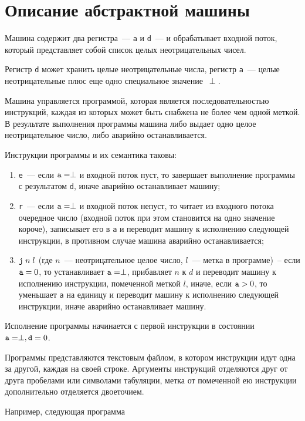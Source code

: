 \documentclass{article}
\newcommand{\cd}[1]{\texttt{#1}}
\begin{document}
\section*{Описание абстрактной машины}

Машина содержит два регистра~--- \cd{a} и \cd{d}~--- и обрабатывает входной поток, который
представляет собой список целых неотрицательных чисел. 

Регистр \cd{d} может хранить целые неотрицательные числа, регистр \cd{a}~--- целые неотрицательные
плюс еще одно специальное значение~$\perp$.

Машина управляется программой, которая является последовательностью инструкций, каждая из
которых может быть снабжена не более чем одной меткой. В результате выполнения программы
машина либо выдает одно целое неотрицательное число, либо аварийно останавливается.
 
Инструкции программы и их семантика таковы:

\begin{enumerate}
\item \cd{e}~--- если $\mbox{\cd{a}}=\perp$ и входной поток пуст, то завершает выполнение
программы с результатом \cd{d}, иначе аварийно останавливает машину;
\item \cd{r}~--- если  $\mbox{\cd{a}}=\perp$ и входной поток непуст, то читает из входного
потока очередное число (входной поток при этом становится на одно значение короче), записывает его в \cd{a} и
переводит машину к исполнению следующей инструкции, в противном случае машина аварийно останавливается;
\item $\mbox{\cd{j}}\;n\;l$ (где $n$~--- неотрицательное целое число, $l$~--- метка в программе)~-- если $\mbox{\cd{a}}=0$, то устанавливает
$\mbox{\cd{a}}=\perp$, прибавляет $n$ к $d$ и переводит машину к исполнению инструкции, помеченной меткой $l$, иначе, если
$\mbox{\cd{a}}>0$, то уменьшает \cd{a} на единицу и переводит машину к исполнению следующей
инструкции, иначе аварийно останавливает машину.
\end{enumerate}

Исполнение программы начинается с первой инструкции в состоянии $\mbox{\cd{a}}=\perp,\mbox{\cd{d}}=0$.

Программы представляются текстовым файлом, в котором инструкции идут одна за другой, каждая на
своей строке. Аргументы инструкций отделяются друг от друга пробелами или символами табуляции, 
метка от помеченной ею инструкции дополнительно отделяется двоеточием.

Например, следующая программа
\end{document}
